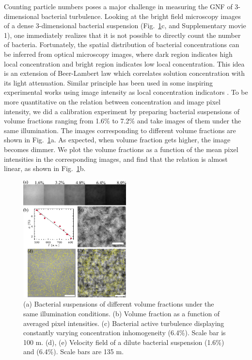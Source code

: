 \documentclass[twocolumn,aps,prl,amsmath,amssymb,longbibliography]{revtex4-2}
\begin{document}
Counting particle numbers poses a major challenge in measuring the GNF of 3-dimensional bacterial turbulence. Looking at the bright field microscopy images of a dense 3-dimensional bacterial suspension (Fig.~\ref{fig:1}c, and Supplementary movie 1), one immediately realizes that it is not possible to directly count the number of bacteria. Fortunately, the spatial distribution of bacterial concentrations can be inferred from optical microscopy images, where dark region indicates high local concentration and bright region indicates low local concentration. This idea is an extension of Beer-Lambert law which correlates solution concentration with its light attenuation. Similar principle has been used in some inspiring experimental works using image intensity as local concentration indicators \cite{Wilson2011, Schaller2013}. To be more quantitative on the relation between concentration and image pixel intensity, we did a calibration experiment by preparing bacterial suspensions of volume fractions ranging from 1.6\% to 7.2\% and take images of them under the same illumination. The images corresponding to different volume fractions are shown in Fig.~\ref{fig:1}a. As expected, when volume fraction gets higher, the image becomes dimmer. We plot the volume fractions as a function of the mean pixel intensities in the corresponding images, and find that the relation is almost linear, as shown in Fig.~\ref{fig:1}b.


\begin{figure}[ht]
\begin{center}
\includegraphics[width=0.5\textwidth]{figures/fig-1/v3.pdf}
\caption[Experimental details]
{
(a) Bacterial suspensions of different volume fractions under the same illumination conditions.
(b) Volume fraction as a function of averaged pixel intensities.
(c) Bacterial active turbulence displaying constantly varying concentration inhomogeneity (6.4\%). Scale bar is 100 \textmu m.
(d), (e) Velocity field of a dilute bacterial suspension (1.6\%) and (6.4\%). Scale bars are 135 \textmu m.
}
\label{fig:1}
\end{center}
\end{figure}
\end{document}
